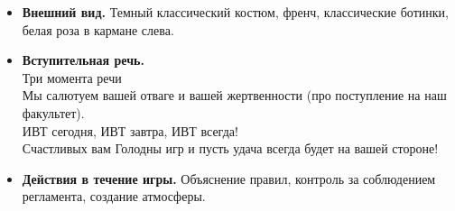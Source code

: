 
\begin{itemize}
\item \textbf{Внешний вид.} Темный классический костюм, френч, классические ботинки, белая роза в кармане слева.

\item \textbf{Вступительная речь.}\\
Три момента речи\\
Мы салютуем вашей отваге и вашей жертвенности (про поступление на наш факультет).\\
ИВТ сегодня, ИВТ завтра, ИВТ всегда!\\
Счастливых вам Голодны игр и пусть удача всегда будет на вашей стороне!

\item \textbf{Действия в течение игры.} Объяснение правил, контроль за соблюдением регламента, создание атмосферы.
\end{itemize}